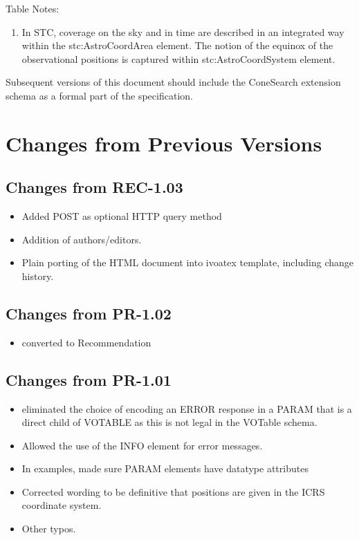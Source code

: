 \documentclass[11pt,a4paper]{ivoa}
\begin{document}
Table Notes:
\begin{enumerate}
	\item In STC, coverage on the sky and in time are described in an integrated way within the stc:AstroCoordArea element. The notion of the equinox of the observational positions is captured within stc:AstroCoordSystem element.
\end{enumerate}
Subsequent versions of this document should include the ConeSearch extension schema as a formal part of the specification.

\section{Changes from Previous Versions}
\label{app:changes}

\subsection{Changes from REC-1.03}
\begin{itemize}
	\item Added POST as optional HTTP query method
	\item Addition of authors/editors.
	\item Plain porting of the HTML document into ivoatex template, including change history.
\end{itemize}

\subsection{Changes from PR-1.02}
\begin{itemize}
	\item converted to Recommendation
\end{itemize}

\subsection{Changes from PR-1.01}
\begin{itemize}
	\item eliminated the choice of encoding an ERROR response in a PARAM that is a direct child of VOTABLE as this is not legal in the VOTable schema.
	\item Allowed the use of the INFO element for error messages.
	\item In examples, made sure PARAM elements have datatype attributes
	\item Corrected wording to be definitive that positions are given in the ICRS coordinate system.
	\item Other typos.
\end{itemize}
\end{document}
